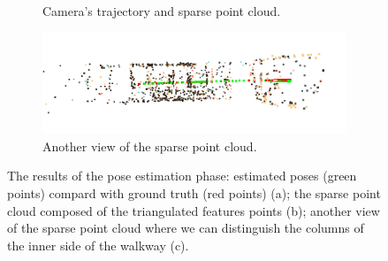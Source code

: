 \begin{figure}[h]
\begin{subfigure}{0.45\linewidth}
\caption{Camera's trajectory and sparse point cloud.}
\label{fig:trajectory2}
\end{subfigure}
\begin{subfigure}{\linewidth}
\includegraphics[width=\linewidth]{img/snapshot02.png}
\caption{Another view of the sparse point cloud.}
\label{fig:trajectory3}
\end{subfigure}
\caption{The results of the pose estimation phase: estimated poses (green
points) compard with ground truth (red points) (a); the sparse point cloud
composed of the triangulated features points (b); another view of the sparse
point cloud where we can distinguish the columns of the inner side of the
walkway (c).}
\label{fig:trajectory}
\end{figure}
%
